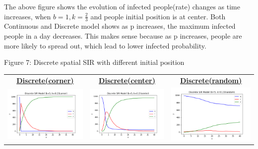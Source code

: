 \documentclass[11pt,a4paper]{article}
\begin{document}
\medskip \noindent \newline
The above figure shows the evolution of infected people(rate) changes as time increases, when $b=1, k=\frac{2}{3}$ and people initial position is at center. Both Continuous and Discrete model shows as p increases, the maximum infected people in a day decreases. This makes sense because as p increases, people are more likely to spread out, which lead to lower infected probability. 

  \begin{center}
 	Figure 7: Discrete spatial SIR with different initial position 
 \end{center}
 \begin{center}
 	
 	\begin{tabular}{c c c}
 		\textbf{\underline{Discrete(corner)}} &
 		\textbf{\underline{Discrete(center)}} &
 		\textbf{\underline{Discrete(random)}} \\
 		\includegraphics[width=.33\textwidth]{D_SIR_S_corner.png} & \includegraphics[width=.33\textwidth]{D_SIR_S_center.png}& \includegraphics[width=.33\textwidth]{D_SIR_S_random.png}
 	\end{tabular}
 
 \end{center}
\end{document}
